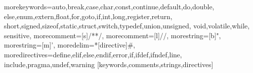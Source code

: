 

%
  {morekeywords={auto,break,case,char,const,continue,default,do,double,%
      else,enum,extern,float,for,goto,if,int,long,register,return,%
      short,signed,sizeof,static,struct,switch,typedef,union,unsigned,%
      void,volatile,while},%
  sensitive,%
  morecomment=[s]{/*}{*/},%
  morecomment=[l]//,%
  morestring=[b]",%
  morestring=[m]',%
  moredelim=*[directive]\#,%
  moredirectives={define,elif,else,endif,error,if,ifdef,ifndef,line,%
  include,pragma,undef,warning}%
}[keywords,comments,strings,directives]%


